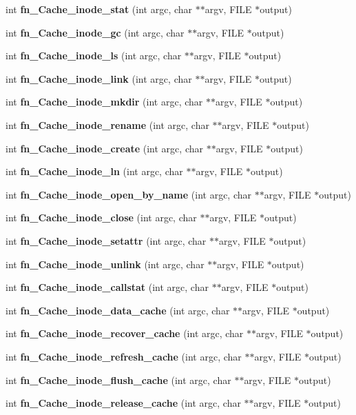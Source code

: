 \begin{DoxyCompactItemize}
\item 
int {\bf fn\_\-Cache\_\-inode\_\-stat} (int argc, char $\ast$$\ast$argv, FILE $\ast$output)
\item 
int {\bf fn\_\-Cache\_\-inode\_\-gc} (int argc, char $\ast$$\ast$argv, FILE $\ast$output)
\item 
int {\bf fn\_\-Cache\_\-inode\_\-ls} (int argc, char $\ast$$\ast$argv, FILE $\ast$output)
\item 
int {\bf fn\_\-Cache\_\-inode\_\-link} (int argc, char $\ast$$\ast$argv, FILE $\ast$output)
\item 
int {\bf fn\_\-Cache\_\-inode\_\-mkdir} (int argc, char $\ast$$\ast$argv, FILE $\ast$output)
\item 
int {\bf fn\_\-Cache\_\-inode\_\-rename} (int argc, char $\ast$$\ast$argv, FILE $\ast$output)
\item 
int {\bf fn\_\-Cache\_\-inode\_\-create} (int argc, char $\ast$$\ast$argv, FILE $\ast$output)
\item 
int {\bf fn\_\-Cache\_\-inode\_\-ln} (int argc, char $\ast$$\ast$argv, FILE $\ast$output)
\item 
int {\bf fn\_\-Cache\_\-inode\_\-open\_\-by\_\-name} (int argc, char $\ast$$\ast$argv, FILE $\ast$output)
\item 
int {\bf fn\_\-Cache\_\-inode\_\-close} (int argc, char $\ast$$\ast$argv, FILE $\ast$output)
\item 
int {\bf fn\_\-Cache\_\-inode\_\-setattr} (int argc, char $\ast$$\ast$argv, FILE $\ast$output)
\item 
int {\bf fn\_\-Cache\_\-inode\_\-unlink} (int argc, char $\ast$$\ast$argv, FILE $\ast$output)
\item 
int {\bf fn\_\-Cache\_\-inode\_\-callstat} (int argc, char $\ast$$\ast$argv, FILE $\ast$output)
\item 
int {\bf fn\_\-Cache\_\-inode\_\-data\_\-cache} (int argc, char $\ast$$\ast$argv, FILE $\ast$output)
\item 
int {\bf fn\_\-Cache\_\-inode\_\-recover\_\-cache} (int argc, char $\ast$$\ast$argv, FILE $\ast$output)
\item 
int {\bf fn\_\-Cache\_\-inode\_\-refresh\_\-cache} (int argc, char $\ast$$\ast$argv, FILE $\ast$output)
\item 
int {\bf fn\_\-Cache\_\-inode\_\-flush\_\-cache} (int argc, char $\ast$$\ast$argv, FILE $\ast$output)
\item 
int {\bf fn\_\-Cache\_\-inode\_\-release\_\-cache} (int argc, char $\ast$$\ast$argv, FILE $\ast$output)
\item 

\end{DoxyCompactItemize}
